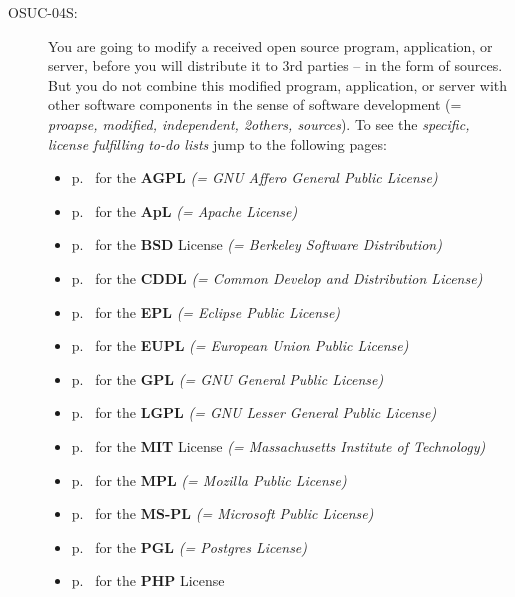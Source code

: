 \begin{description}
\item[OSUC-04S:]\label{OSUC-04S-DEF} You are going to modify a received open
source program, application, or server, before you will distribute it to 3rd
parties -- in the form of sources. But you do not combine this modified program,
application, or server with other software components in the sense of software
development (= \textit{proapse, modified, independent, 2others, sources}).
To see the \textit{specific, license fulfilling to-do lists} jump to the
following pages:
  \begin{itemize}
    \item p.\ \pageref{OSUC-04S-AGPL} for the \textbf{AGPL}
      \textit{(= GNU Affero General Public License)} 
    \item p.\ \pageref{OSUC-04S-Apache20} for the \textbf{ApL}
      \textit{(= Apache License)}
    \item p.\ \pageref{OSUC-04S-BSD} for the \textbf{BSD} License
      \textit{(= Berkeley Software Distribution)}
    \item p.\ \pageref{OSUC-04S-CDDL} for the \textbf{CDDL}
      \textit{(= Common Develop and Distribution License)}  
    \item p.\ \pageref{OSUC-04S-EPL} for the \textbf{EPL}
      \textit{(= Eclipse Public License)}     
    \item p.\ \pageref{OSUC-04S-EUPL} for the \textbf{EUPL}
      \textit{(= European Union Public License)} 
    \item p.\ \pageref{OSUC-04S-GPL} for the \textbf{GPL}
       \textit{(= GNU General Public License)} 
    \item p.\ \pageref{OSUC-04S-LGPL} for the \textbf{LGPL}
      \textit{(= GNU Lesser General Public License)}           
    \item p.\ \pageref{OSUC-04S-MIT} for the \textbf{MIT} License
       \textit{(= Massachusetts Institute of Technology)} 
    \item p.\ \pageref{OSUC-04S-MPL} for the \textbf{MPL}
      \textit{(= Mozilla Public License)}     
    \item p.\ \pageref{OSUC-04S-MS-PL} for the \textbf{MS-PL}
      \textit{(= Microsoft Public License)} 
    \item p.\ \pageref{OSUC-04S-PGL} for the \textbf{PGL}
      \textit{(= Postgres License)} 
    \item p.\ \pageref{OSUC-04S-PHP} for the \textbf{PHP} License 
  \end{itemize}
  

\end{description}
